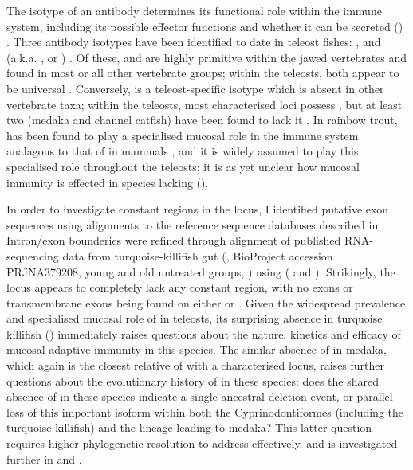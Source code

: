 	The isotype of an antibody determines its functional role within the immune system, including its possible effector functions and whether it can be secreted () \parencite{schroeder2010immunoglobulins}. Three antibody isotypes have been identified to date in teleost fishes: ,  and  (a.k.a. ,  or ) \parencite{fillatreau2013astonishing,bengten2015fishantibodies,magadan2015fishrepertoires}. Of these,  and  are highly primitive within the jawed vertebrates and found in most or all other vertebrate groups; within the teleosts, both appear to be universal \parencite{bengten2015fishantibodies}. Conversely,  is a teleost-specific isotype which is absent in other vertebrate taxa; within the teleosts, most characterised \igh{} loci possess , but at least two (medaka and channel catfish) have been found to lack it \parencite{fillatreau2013astonishing,bengten2015fishantibodies}. In rainbow trout,  has been found to play a specialised mucosal role in the immune system analagous to that of  in mammals \parencite{zhang2010igtgut,xu2013igtskin}, and it is widely assumed to play this specialised role throughout the teleosts; it is as yet unclear how mucosal immunity is effected in species lacking  ().

In order to investigate constant regions in the \nfu \igh{} locus, I identified putative exon sequences using  alignments to the reference sequence databases described in . Intron/exon bounderies were refined through alignment of published RNA-sequencing data from turquoise-killifish gut (\parencite{smith2017microbiota}, BioProject accession PRJNA379208, young and old untreated groups, ) using  ( and ). Strikingly, the \nfu \igh{} locus appears to completely lack any  constant region, with no \cz{} exons or  transmembrane exons being found on either  or . Given the widespread prevalence and specialised mucosal role of  in teleosts, its surprising absence in turquoise killifish () immediately raises questions about the nature, kinetics and efficacy of mucosal adaptive immunity in this species. The similar absence of  in medaka, which again is the closest relative of \Nfu with a characterised locus, raises further questions about the evolutionary history of  in these species: does the shared absence of  in these species indicate a single ancestral deletion event, or parallel loss of this important isoform within both the Cyprinodontiformes (including the turquoise killifish) and the lineage leading to medaka? This latter question requires higher phylogenetic resolution to address effectively, and is investigated further in  and .
	

